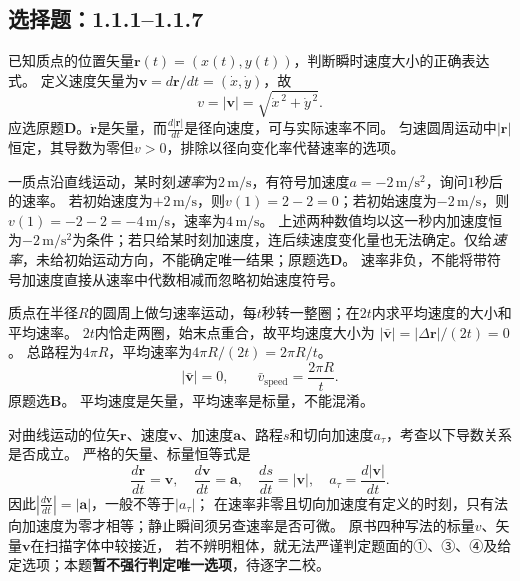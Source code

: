

\subsection{选择题：1.1.1--1.1.7}
\problemtext 已知质点的位置矢量$\bm r(t)=(x(t),y(t))$，判断瞬时速度大小的正确表达式。
\workings
定义速度矢量为$\bm v=d\bm r/dt=(\dot x,\dot y)$，故
\[
 \boxed{v=|\bm v|=\sqrt{\dot x^{\,2}+\dot y^{\,2}}}.
\]
应选原题\textbf{D}。$\dot{\bm r}$是矢量，而$\frac{d|\bm r|}{dt}$是径向速度，可与实际速率不同。
\crosscheck 匀速圆周运动中$|\bm r|$恒定，其导数为零但$v>0$，排除以径向变化率代替速率的选项。

\problemtext 一质点沿直线运动，某时刻\emph{速率}为$2\,\mathrm{m/s}$，有符号加速度$a=-2\,\mathrm{m/s^2}$，询问$1$秒后的速率。
\workings
若初始速度为$+2\,\mathrm{m/s}$，则$v(1)=2-2=0$；若初始速度为$-2\,\mathrm{m/s}$，则$v(1)=-2-2=-4\,\mathrm{m/s}$，速率为$4\,\mathrm{m/s}$。
上述两种数值均以这一秒内加速度恒为$-2\,\mathrm{m/s^2}$为条件；若只给某时刻加速度，连后续速度变化量也无法确定。仅给\emph{速率}，未给初始运动方向，不能确定唯一结果；原题选\textbf{D}。
\crosscheck 速率非负，不能将带符号加速度直接从速率中代数相减而忽略初始速度符号。

\problemtext 质点在半径$R$的圆周上做匀速率运动，每$t$秒转一整圈；在$2t$内求平均速度的大小和平均速率。
\workings
$2t$内恰走两圈，始末点重合，故平均速度大小为
$|\bar{\bm v}|=|\Delta\bm r|/(2t)=0$。
总路程为$4\pi R$，平均速率为$4\pi R/(2t)=2\pi R/t$。
\[
\boxed{|\bar{\bm v}|=0,\qquad \bar v_{\mathrm{speed}}=\frac{2\pi R}{t}}.
\]
原题选\textbf{B}。
\crosscheck 平均速度是矢量，平均速率是标量，不能混淆。

\problemtext 对曲线运动的位矢$\bm r$、速度$\bm v$、加速度$\bm a$、路程$s$和切向加速度$a_\tau$，考查以下导数关系是否成立。
\workings
严格的矢量、标量恒等式是
\[
 \boxed{\frac{d\bm r}{dt}=\bm v,\quad
 \frac{d\bm v}{dt}=\bm a,\quad
 \frac{ds}{dt}=|\bm v|,\quad
 a_\tau=\frac{d|\bm v|}{dt}.}
\]
因此$\left|\frac{d\bm v}{dt}\right|=|\bm a|$，一般不等于$|a_\tau|$；
在速率非零且切向加速度有定义的时刻，只有法向加速度为零才相等；静止瞬间须另查速率是否可微。
\crosscheck 原书四种写法的标量$v$、矢量$\bm v$在扫描字体中较接近，
若不辨明粗体，就无法严谨判定题面的①、③、④及给定选项；本题\textbf{暂不强行判定唯一选项}，待逐字二校。

